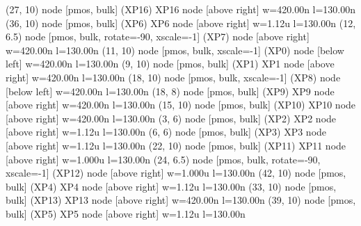 \begin{circuitikz}[american]
	(27, 10) node [pmos, bulk] (XP16) {XP16} node [above right] {\tiny {w=420.00n l=130.00n}}
	(36, 10) node [pmos, bulk] (XP6) {XP6} node [above right] {\tiny {w=1.12u l=130.00n}}
	(12, 6.5) node [pmos, bulk, rotate=-90, xscale=-1] (XP7) {} node [above right] {\tiny {w=420.00n l=130.00n}}
	(11, 10) node [pmos, bulk, xscale=-1] (XP0) {} node [below left] {\tiny {w=420.00n l=130.00n}}
	(9, 10) node [pmos, bulk] (XP1) {XP1} node [above right] {\tiny {w=420.00n l=130.00n}}
	(18, 10) node [pmos, bulk, xscale=-1] (XP8) {} node [below left] {\tiny {w=420.00n l=130.00n}}
	(18, 8) node [pmos, bulk] (XP9) {XP9} node [above right] {\tiny {w=420.00n l=130.00n}}
	(15, 10) node [pmos, bulk] (XP10) {XP10} node [above right] {\tiny {w=420.00n l=130.00n}}
	(3, 6) node [pmos, bulk] (XP2) {XP2} node [above right] {\tiny {w=1.12u l=130.00n}}
	(6, 6) node [pmos, bulk] (XP3) {XP3} node [above right] {\tiny {w=1.12u l=130.00n}}
	(22, 10) node [pmos, bulk] (XP11) {XP11} node [above right] {\tiny {w=1.000u l=130.00n}}
	(24, 6.5) node [pmos, bulk, rotate=-90, xscale=-1] (XP12) {} node [above right] {\tiny {w=1.000u l=130.00n}}
	(42, 10) node [pmos, bulk] (XP4) {XP4} node [above right] {\tiny {w=1.12u l=130.00n}}
	(33, 10) node [pmos, bulk] (XP13) {XP13} node [above right] {\tiny {w=420.00n l=130.00n}}
	(39, 10) node [pmos, bulk] (XP5) {XP5} node [above right] {\tiny {w=1.12u l=130.00n}}



\end{circuitikz}
